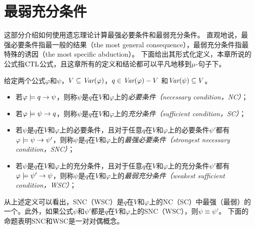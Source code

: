 \section{最弱充分条件}
\label{chapter04:sec:snc}
这部分介绍如何使用遗忘理论计算最强必要条件和最弱充分条件。
直观地说，最强必要条件指最一般的结果（the most general consequence），最弱充分条件指最特殊的诱因（the most specific abduction）。
下面给出其形式化定义，本章所说的公式指$\textrm{CTL}$公式，且这章所有的定义和结论都可以平凡地移到$\mu$-句子下。
\begin{definition}[充分和必要条件]\label{def:NC:SC}
	给定两个公式$\varphi$和$\psi$，$V \subseteq \textit{Var}(\varphi)$，$q\in\textit{Var}(\varphi)- V$
	和$\textit{Var}(\psi)\subseteq V$。
	\begin{itemize}
		\item 若$\varphi \models q \rightarrow \psi$，则称$\psi$是$q$在$V$和$\varphi$上的{\em 必要条件（necessary condition，NC）}；
		\item 若$\varphi \models \psi\rightarrow q$，则称$\psi$是$q$在$V$和$\varphi$上的{\em 充分条件（sufficient condition，SC）}；
		\item 若$\psi$是$q$在$V$和$\varphi$上的必要条件，且对于任意$q$在$V$和$\varphi$上的必要条件$\psi'$都有$\varphi\models\psi\rightarrow\psi'$，则称$\psi$是$q$在$V$和$\varphi$上的{\em 最强必要条件（strongest necessary condition，SNC）}；
		\item 若$\psi$是$q$在$V$和$\varphi$上的充分条件，且对于任意$q$在$V$和$\varphi$上的充分条件$\psi'$都有$\varphi\models\psi'\rightarrow\psi$，则称$\psi$是$q$在$V$和$\varphi$上的{\em 最弱充分条件（weakest sufficient condition，WSC）}；
	\end{itemize}
\end{definition}

从上述定义可以看出，SNC（WSC）是$q$在$V$和$\varphi$上的NC（SC）中最强（最弱）的一个。此外，如果公式$\psi$和$\psi'$都是$q$在$V$和$\varphi$上的SNC（WSC），则$\psi \equiv \psi'$。
下面的命题表明SNC和WSC是一对对偶概念。

